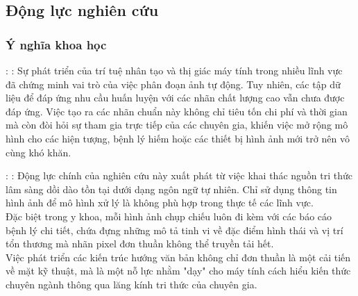
\subsection{Động lực nghiên cứu}
\subsubsection{Ý nghĩa khoa học}
\begin{frame}{\secname: \subsecname: \subsubsecname}
    Sự phát triển của trí tuệ nhân tạo và thị giác máy tính trong nhiều lĩnh vực đã chứng minh vai trò của việc phân đoạn ảnh tự động. Tuy nhiên, các tập dữ liệu để đáp ứng nhu cầu huấn luyện với các nhãn chất lượng cao vẫn chưa được đáp ứng. Việc tạo ra các nhãn chuẩn này không chỉ tiêu tốn chi phí và thời gian mà còn đòi hỏi sự tham gia trực tiếp của các chuyên gia, khiến việc mở rộng mô hình cho các hiện tượng, bệnh lý hiếm hoặc các thiết bị hình ảnh mới trở nên vô cùng khó khăn.
\end{frame}

\begin{frame}{\secname: \subsecname: \subsubsecname}
    Động lực chính của nghiên cứu này xuất phát từ việc khai thác nguồn tri thức lâm sàng dồi dào tồn tại dưới dạng ngôn ngữ tự nhiên. Chỉ sử dụng thông tin hình ảnh để mô hình xử lý là không phù hợp trong thực tế các lĩnh vực. \\
    Đặc biệt trong y khoa, mỗi hình ảnh chụp chiếu luôn đi kèm với các báo cáo bệnh lý chi tiết, chứa đựng những mô tả tinh vi về đặc điểm hình thái và vị trí tổn thương mà nhãn pixel đơn thuần không thể truyền tải hết. \\
    Việc phát triển các kiến trúc hướng văn bản không chỉ đơn thuần là một cải tiến về mặt kỹ thuật, mà là một nỗ lực nhằm "dạy" cho máy tính cách hiểu kiến thức chuyên ngành thông qua lăng kính tri thức của chuyên gia.
\end{frame}

